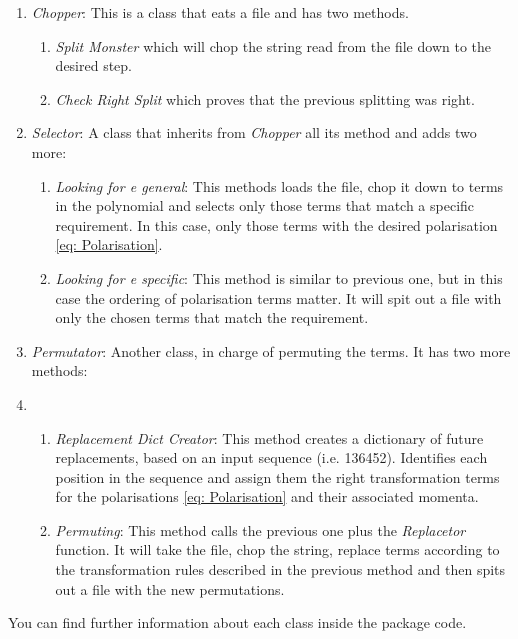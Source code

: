 \documentclass[11pt]{article} %
\begin{document}
\begin{enumerate}
	\item \textit{Chopper}: This is a class that eats a file and has two methods.
	\begin{enumerate}
		\item \textit{Split Monster} which will chop the string read from the file down to the desired step.
		\item \textit{Check Right Split} which proves that the previous splitting was right.
	\end{enumerate}
	\item \textit{Selector}: A class that inherits from \textit{Chopper} all its method and adds two more:
	\begin{enumerate}
		\item \textit{Looking for e general}: This methods loads the file, chop it down to terms in the polynomial and selects only those terms that match a specific requirement. In this case, only those terms with the desired polarisation \ref{eq: Polarisation}.
		\item \textit{Looking for e specific}: This method is similar to previous one, but in this case the ordering of polarisation terms matter. It will spit out a file with only the chosen terms that match the requirement.
	\end{enumerate}
	\newpage
	\item \textit{Permutator}: Another class, in charge of permuting the terms. It has two more methods:
	\item \begin{enumerate}
		\item \textit{Replacement Dict Creator}: This method creates a dictionary of future replacements, based on an input sequence (i.e. 136452). Identifies each position in the sequence and assign them the right transformation terms for the polarisations \ref{eq: Polarisation} and their associated momenta.
		\item \textit{Permuting}: This method calls the previous one plus the \textit{Replacetor} function. It will take the file, chop the string, replace terms according to the transformation rules described in the previous method and then spits out a file with the new permutations.
	\end{enumerate}
\end{enumerate}

You can find further information about each class inside the package code.
\end{document}
